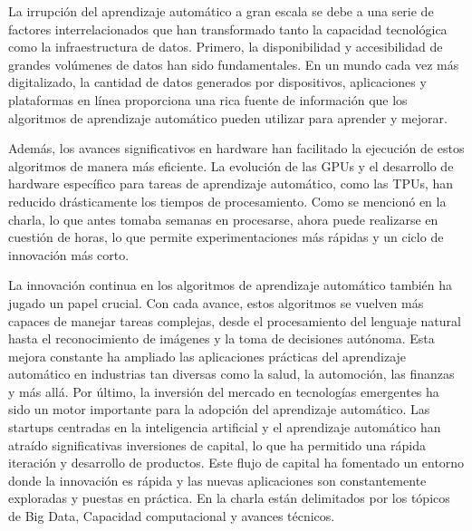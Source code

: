 \documentclass{article}
\begin{document}
\begin{enumerate}
\begin{enumerate}
\par La irrupción del aprendizaje automático a gran escala se debe a una serie de factores interrelacionados que han transformado tanto la capacidad tecnológica como la infraestructura de datos. Primero, la disponibilidad y accesibilidad de grandes volúmenes de datos han sido fundamentales. En un mundo cada vez más digitalizado, la cantidad de datos generados por dispositivos, aplicaciones y plataformas en línea proporciona una rica fuente de información que los algoritmos de aprendizaje automático pueden utilizar para aprender y mejorar.
\par Además, los avances significativos en hardware han facilitado la ejecución de estos algoritmos de manera más eficiente. La evolución de las GPUs y el desarrollo de hardware específico para tareas de aprendizaje automático, como las TPUs, han reducido drásticamente los tiempos de procesamiento. Como se mencionó en la charla, lo que antes tomaba semanas en procesarse, ahora puede realizarse en cuestión de horas, lo que permite experimentaciones más rápidas y un ciclo de innovación más corto.
\vspace{5px}
\par La innovación continua en los algoritmos de aprendizaje automático también ha jugado un papel crucial. Con cada avance, estos algoritmos se vuelven más capaces de manejar tareas complejas, desde el procesamiento del lenguaje natural hasta el reconocimiento de imágenes y la toma de decisiones autónoma. Esta mejora constante ha ampliado las aplicaciones prácticas del aprendizaje automático en industrias tan diversas como la salud, la automoción, las finanzas y más allá. Por último, la inversión del mercado en tecnologías emergentes ha sido un motor importante para la adopción del aprendizaje automático. Las startups centradas en la inteligencia artificial y el aprendizaje automático han atraído significativas inversiones de capital, lo que ha permitido una rápida iteración y desarrollo de productos. Este flujo de capital ha fomentado un entorno donde la innovación es rápida y las nuevas aplicaciones son constantemente exploradas y puestas en práctica. En la charla están delimitados por los tópicos de Big Data, Capacidad computacional y avances técnicos.


\end{enumerate}
\end{enumerate}
\end{document}
